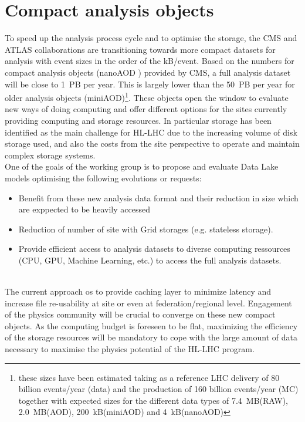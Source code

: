 \section{Compact analysis objects}
To speed up the analysis process cycle and to optimise the storage, the CMS and ATLAS collaborations are transitioning towards more compact datasets for analysis with event sizes in the order of the kB/event. Based on the numbers for compact analysis objects (nanoAOD \cite{nano}) provided by CMS, a full analysis dataset will be close to 1~PB per year. This is largely lower than the 50~PB per year for older analysis objects (miniAOD)\footnote{ these sizes have been estimated taking as a reference LHC delivery of 80 billion events/year (data) and the production of 160 billion events/year (MC) together with expected sizes for the different data types of 7.4~MB(RAW), 2.0~MB(AOD), 200~kB(miniAOD) and 4~kB(nanoAOD)}. These objects open the window to evaluate new ways of doing computing and offer different options for the sites currently providing computing and storage resources. In particular storage has been identified as the main challenge for HL-LHC due to the increasing volume of disk storage used, and also the costs from the site perspective to operate and maintain complex storage systems.\\
One of the goals of the working group is to propose and evaluate Data Lake models optimising the following evolutions or requests:
\begin{itemize}
\item Benefit from these new analysis data format and their reduction in size which are exppected to be heavily accessed 
\item Reduction of number of site with Grid storages (e.g. stateless storage).
\item Provide efficient access to analysis datasets to diverse computing ressources  (CPU, GPU, Machine Learning, etc.) to access the full analysis datasets.
\end{itemize}\\
The current approach os to provide caching layer to minimize latency and increase file re-usability at site or even at federation/regional level.
Engagement of the physics community will be crucial to converge on these new compact objects. As the computing budget is foreseen to be flat, maximizing the efficiency of the storage resources will be mandatory to cope with the large amount of data necessary to maximise the physics potential of the HL-LHC program. \\
